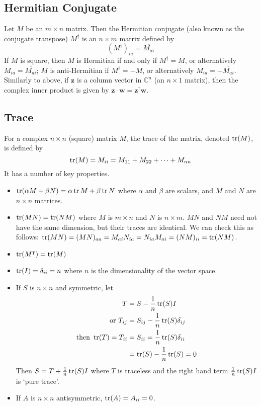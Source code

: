 \documentclass{article}
\begin{document}
\subsection{Hermitian Conjugate}
Let $M$ be an $m \times n$ matrix. Then the Hermitian conjugate (also known as the conjugate transpose) $M^\dagger$ is an $n \times m$ matrix defined by
\[
	(M^\dagger)_{ia} = \overline{M_{ai}}
\]
If $M$ is square, then $M$ is Hermitian if and only if $M^\dagger = M$, or alternatively $M_{ia} = \overline{M_{ai}}$; $M$ is anti-Hermitian if $M^\dagger = -M$, or alternatively $M_{ia} = -\overline{M_{ai}}$. Similarly to above, if $\bm z$ is a column vector in $\mathbb C^n$ (an $n \times 1$ matrix), then the complex inner product is given by $\bm z \cdot \bm w = \bm z^\dagger \bm w$.

\subsection{Trace}
For a complex $n \times n$ (square) matrix $M$, the trace of the matrix, denoted $\tr(M)$, is defined by
\[ \tr(M) = M_{ii} = M_{11} + M_{22} + \cdots + M_{nn} \]
It has a number of key properties.
\begin{itemize}
	\item $\tr(\alpha M + \beta N) = \alpha \tr M + \beta \tr N$ where $\alpha$ and $\beta$ are scalars, and $M$ and $N$ are $n \times n$ matrices.
	\item $\tr(MN) = \tr(NM)$ where $M$ is $m \times n$ and $N$ is $n \times m$. $MN$ and $NM$ need not have the same dimension, but their traces are identical. We can check this as follows: $\tr(MN) = (MN)_{aa} = M_{ai} N_{ia} = N_{ia} M_{ai} = (NM)_{ii} = \tr(NM)$.
	\item $\tr(M^\intercal) = \tr(M)$
	\item $\tr(I) = \delta_{ii} = n$ where $n$ is the dimensionality of the vector space.
	\item If $S$ is $n \times n$ and symmetric, let
	      \begin{align*}
		      T                             & = S - \frac{1}{n}\tr(S) I                \\
		      \text{or } T_{ij}             & = S_{ij} - \frac{1}{n}\tr(S) \delta_{ij} \\
		      \text{then } \tr (T) = T_{ii} & = S_{ii} = \frac{1}{n}\tr(S) \delta_{ii} \\
		                                    & = \tr(S) - \frac{1}{n}\tr(S) = 0
	      \end{align*}
	      Then $S = T + \frac{1}{n}\tr(S)I$ where $T$ is traceless and the right hand term $\frac{1}{n}\tr(S)I$ is `pure trace'.
	\item If $A$ is $n \times n$ antisymmetric, $\tr(A) = A_{ii} = 0$.
\end{itemize}
\end{document}
